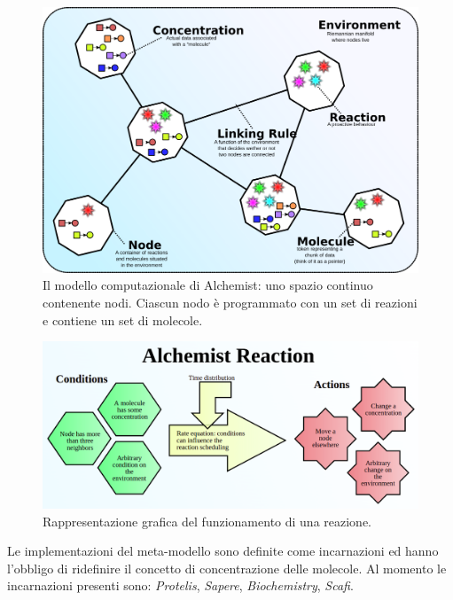 \documentclass[12pt,a4paper,openright,oneside]{book}
\begin{document}
\begin{figure}
	\centering
	\includegraphics[width=0.8\linewidth]{images/alchemist-meta-model.png}
	\caption{Il modello computazionale di Alchemist: uno spazio continuo contenente nodi. Ciascun nodo è programmato con un set di reazioni e contiene un set di molecole. }
	\label{fig:alchemist-meta-model}
\end{figure}
\begin{figure}
	\centering
	\includegraphics[width=1\linewidth]{images/alchemist-reaction.png}
	\caption{Rappresentazione grafica del funzionamento di una reazione.}
	\label{fig:alchemist-reaction}
\end{figure}
Le implementazioni del meta-modello sono definite come incarnazioni ed hanno l’obbligo di ridefinire il concetto di concentrazione delle molecole. Al momento le incarnazioni presenti sono: \textit{Protelis}, \textit{Sapere}, \textit{Biochemistry}, \textit{Scafi}.
\end{document}

